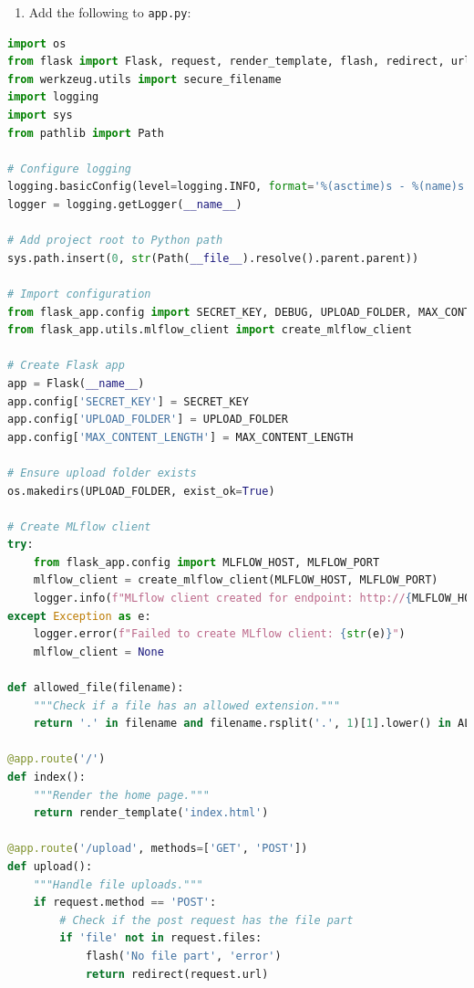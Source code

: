 \documentclass[
  screen,review,acmlarge]{acmart}
\newcommand{\passthrough}[1]{#1}
\providecommand{\tightlist}{%
  \setlength{\itemsep}{0pt}\setlength{\parskip}{0pt}}
\begin{document}
\begin{enumerate}
\def\labelenumi{\arabic{enumi}.}
\setcounter{enumi}{2}
\tightlist
\item
  Add the following to \passthrough{\lstinline!app.py!}:
\end{enumerate}

\begin{lstlisting}[language=Python]
import os
from flask import Flask, request, render_template, flash, redirect, url_for, jsonify
from werkzeug.utils import secure_filename
import logging
import sys
from pathlib import Path

# Configure logging
logging.basicConfig(level=logging.INFO, format='%(asctime)s - %(name)s - %(levelname)s - %(message)s')
logger = logging.getLogger(__name__)

# Add project root to Python path
sys.path.insert(0, str(Path(__file__).resolve().parent.parent))

# Import configuration
from flask_app.config import SECRET_KEY, DEBUG, UPLOAD_FOLDER, MAX_CONTENT_LENGTH, ALLOWED_EXTENSIONS
from flask_app.utils.mlflow_client import create_mlflow_client

# Create Flask app
app = Flask(__name__)
app.config['SECRET_KEY'] = SECRET_KEY
app.config['UPLOAD_FOLDER'] = UPLOAD_FOLDER
app.config['MAX_CONTENT_LENGTH'] = MAX_CONTENT_LENGTH

# Ensure upload folder exists
os.makedirs(UPLOAD_FOLDER, exist_ok=True)

# Create MLflow client
try:
    from flask_app.config import MLFLOW_HOST, MLFLOW_PORT
    mlflow_client = create_mlflow_client(MLFLOW_HOST, MLFLOW_PORT)
    logger.info(f"MLflow client created for endpoint: http://{MLFLOW_HOST}:{MLFLOW_PORT}")
except Exception as e:
    logger.error(f"Failed to create MLflow client: {str(e)}")
    mlflow_client = None

def allowed_file(filename):
    """Check if a file has an allowed extension."""
    return '.' in filename and filename.rsplit('.', 1)[1].lower() in ALLOWED_EXTENSIONS

@app.route('/')
def index():
    """Render the home page."""
    return render_template('index.html')

@app.route('/upload', methods=['GET', 'POST'])
def upload():
    """Handle file uploads."""
    if request.method == 'POST':
        # Check if the post request has the file part
        if 'file' not in request.files:
            flash('No file part', 'error')
            return redirect(request.url)
        

\end{lstlisting}
\end{document}
